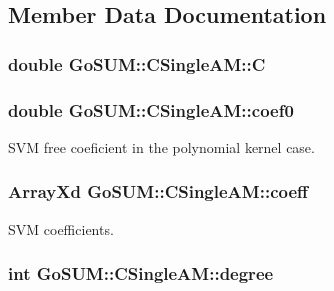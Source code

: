 \subsection{Member Data Documentation}
\hypertarget{class_go_s_u_m_1_1_c_single_a_m_aaa0eba4efdd26680f66cbc04e6a9633a}{
\subsubsection[{C}]{\setlength{\rightskip}{0pt plus 5cm}double Go\-S\-U\-M\-::\-C\-Single\-A\-M\-::\-C\hspace{0.3cm}{\ttfamily [protected]}}}\label{class_go_s_u_m_1_1_c_single_a_m_aaa0eba4efdd26680f66cbc04e6a9633a}
\hypertarget{class_go_s_u_m_1_1_c_single_a_m_af741aaa733aec6ac97d405d39d60f3ab}{
\subsubsection[{coef0}]{\setlength{\rightskip}{0pt plus 5cm}double Go\-S\-U\-M\-::\-C\-Single\-A\-M\-::coef0\hspace{0.3cm}{\ttfamily [protected]}}}\label{class_go_s_u_m_1_1_c_single_a_m_af741aaa733aec6ac97d405d39d60f3ab}


S\-V\-M free coeficient in the polynomial kernel case. 

\hypertarget{class_go_s_u_m_1_1_c_single_a_m_a9000684635e196782000bb3f6cfb7d29}{
\subsubsection[{coeff}]{\setlength{\rightskip}{0pt plus 5cm}Array\-Xd Go\-S\-U\-M\-::\-C\-Single\-A\-M\-::coeff\hspace{0.3cm}{\ttfamily [protected]}}}\label{class_go_s_u_m_1_1_c_single_a_m_a9000684635e196782000bb3f6cfb7d29}


S\-V\-M coefficients. 

\hypertarget{class_go_s_u_m_1_1_c_single_a_m_a1b4eabb824c41f19f9679472e29c2602}{
\subsubsection[{degree}]{\setlength{\rightskip}{0pt plus 5cm}int Go\-S\-U\-M\-::\-C\-Single\-A\-M\-::degree\hspace{0.3cm}{\ttfamily [protected]}}}\label{class_go_s_u_m_1_1_c_single_a_m_a1b4eabb824c41f19f9679472e29c2602}



